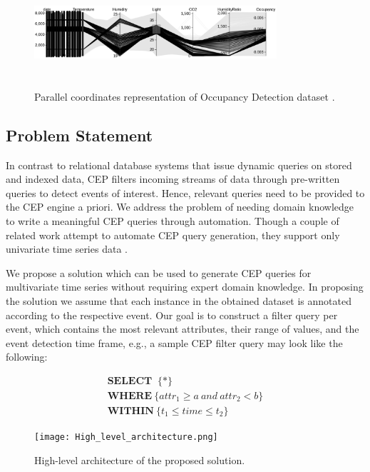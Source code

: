 \documentclass[conference]{IEEEtran}  %
\begin{document}
\begin{figure}
\includegraphics[width=9cm,height=4cm]{occupancy_d3.png}
\caption{Parallel coordinates representation of Occupancy Detection dataset \cite{IEEEexample:Ocupancy}.}
\label{fig:parallcor}
\squeezeup
\end{figure}


\subsection{Problem Statement} 
In contrast to relational database systems that issue dynamic queries on stored and indexed data, CEP filters incoming streams of data through pre-written queries to detect events of interest. Hence, relevant queries need to be provided to the CEP engine a priori. We address the problem of needing domain knowledge to write a meaningful CEP queries through automation. Though a couple of related work attempt to automate CEP query generation, they support only univariate time series data \cite{IEEEexample:autoCEP}.

We propose a solution which can be used to generate CEP queries for multivariate time series without requiring expert domain knowledge. In proposing the solution we assume that each instance in the obtained dataset is annotated according to the respective event. Our goal is to construct a filter query per event, which contains the most relevant attributes, their range of values, and the event detection time frame, e.g., a sample CEP filter query may look like the following:

\begin{equation}
\begin{split}
\textbf{SELECT }\ \{*\} \\ \textbf{WHERE}\ \{attr_1\geq a\ and \ attr_2<b\} \\ \textbf{WITHIN}\ \{t_1\leq time\leq t_2\}
\label{eq:query}
\end{split}
\end{equation}

\begin{figure}
\texttt{[image: High\_level\_architecture.png]}
\caption{High-level architecture of the proposed solution.}
\label{fig:archi}
\end{figure}
\end{document}
